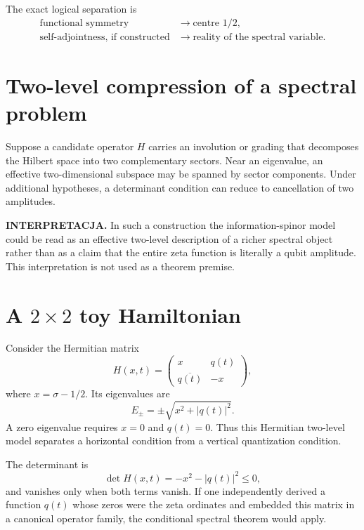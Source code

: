 The exact logical separation is
\begin{align*}
 \text{functional symmetry}&\longrightarrow\text{centre }1/2,\\
 \text{self-adjointness, if constructed}&\longrightarrow\text{reality of the spectral variable}.
\end{align*}

\section{Two-level compression of a spectral problem}

Suppose a candidate operator $H$ carries an involution or grading that decomposes the Hilbert space into two complementary sectors. Near an eigenvalue, an effective two-dimensional subspace may be spanned by sector components. Under additional hypotheses, a determinant condition can reduce to cancellation of two amplitudes.

\textbf{INTERPRETACJA.} In such a construction the information-spinor model could be read as an effective two-level description of a richer spectral object rather than as a claim that the entire zeta function is literally a qubit amplitude. This interpretation is not used as a theorem premise.

\section{A $2\times2$ toy Hamiltonian}

Consider the Hermitian matrix
\begin{equation}
 H(x,t)=
 \begin{pmatrix}
  x & q(t)\\
  \overline{q(t)} & -x
 \end{pmatrix},
 \label{eq:toy-H}
\end{equation}
where $x=\sigma-1/2$. Its eigenvalues are
\[
 E_\pm=\pm\sqrt{x^2+|q(t)|^2}.
\]
A zero eigenvalue requires $x=0$ and $q(t)=0$. Thus this Hermitian two-level model separates a horizontal condition from a vertical quantization condition.

The determinant is
\begin{equation}
 \det H(x,t)=-x^2-|q(t)|^2\le0,
 \label{eq:toy-det}
\end{equation}
and vanishes only when both terms vanish. If one independently derived a function $q(t)$ whose zeros were the zeta ordinates and embedded this matrix in a canonical operator family, the conditional spectral theorem would apply.


